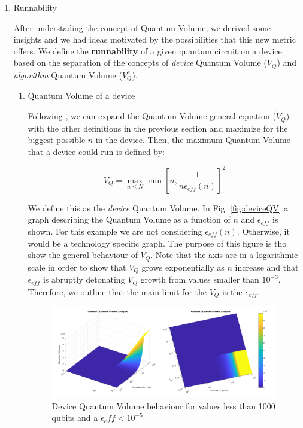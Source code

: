 \begin{enumerate}
\begin{enumerate}
\item Runnability
\label{sec:org462379e}

After understading the concept of Quantum Volume, we derived some insights and we had ideas motivated by the possibilities that this new metric offers. 
We define the \textbf{runnability} of a given quantum circuit on a device based on the separation of the concepts of \emph{device} Quantum Volume (\(V_Q\)) and \emph{algorithm} Quantum Volume (\(V^a_Q\)).


\begin{enumerate}
\item Quantum Volume of a device
\label{sec:org47a97b4}

Following \cite{Bishop_2017,Moll_2018}, we can expand the Quantum Volume general equation (\(\tilde{V}_Q\)) with the other definitions in the previous section and maximize for the biggest possible \(n\) in the device. 
Then, the maximum Quantum Volume that a device could run is defined by:

\begin{equation}
\label{eq:orgce030ed}
V_Q = \max_{n \le N} \min \left[ n,\frac{1}{n \epsilon_{eff} (n)}\right]^2
\end{equation}

We define this as the \emph{device} Quantum Volume. 
In Fig. \ref{fig:deviceQV} a graph describing the Quantum Volume as a function of \(n\) and \(\epsilon_{eff}\) is shown.
For this example we are not considering \(\epsilon_{eff} (n)\).
Otherwise, it would be a technology specific graph.
The purpose of this figure is tho show the general behaviour of \(V_Q\).
Note that the axis are in a logarithmic scale in order to show that \(V_Q\) grows exponentially as \(n\) increase and that \(\epsilon_{eff}\) is abruptly detonating \(V_Q\) growth from values smaller than \(10^{-3}\).
Therefore, we outline that the main limit for the \(V_Q\) is the \(\epsilon_{eff}\).

\begin{figure}[htbp]
\centering
\includegraphics[width=\textwidth]{figures/general_QV.png}
\caption{\label{fig:orgfc7a99d}
Device Quantum Volume behaviour for values less than 1000 qubits and a \(\epsilon_eff < 10^{-5}\)}
\end{figure}


\end{enumerate}
\end{enumerate}
\end{enumerate}
